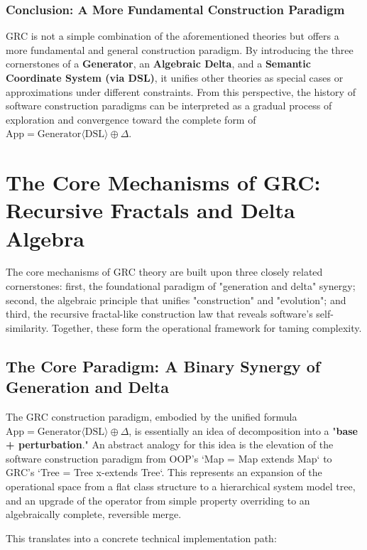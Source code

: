 \documentclass[11pt]{article}
\begin{document}
\subsubsection{Conclusion: A More Fundamental Construction Paradigm}

GRC is not a simple combination of the aforementioned theories but offers a more fundamental and general construction paradigm. By introducing the three cornerstones of a \textbf{Generator}, an \textbf{Algebraic Delta}, and a \textbf{Semantic Coordinate System (via DSL)}, it unifies other theories as special cases or approximations under different constraints. From this perspective, the history of software construction paradigms can be interpreted as a gradual process of exploration and convergence toward the complete form of $\text{App} = \text{Generator}\langle\text{DSL}\rangle \oplus \Delta$.

\section{The Core Mechanisms of GRC: Recursive Fractals and Delta Algebra}

The core mechanisms of GRC theory are built upon three closely related cornerstones: first, the foundational paradigm of "generation and delta" synergy; second, the algebraic principle that unifies "construction" and "evolution"; and third, the recursive fractal-like construction law that reveals software's self-similarity. Together, these form the operational framework for taming complexity.

\subsection{The Core Paradigm: A Binary Synergy of Generation and Delta}

The GRC construction paradigm, embodied by the unified formula $\text{App} = \text{Generator}\langle\text{DSL}\rangle \oplus \Delta$, is essentially an idea of decomposition into a "\textbf{base + perturbation}." An abstract analogy for this idea is the elevation of the software construction paradigm from OOP's `Map = Map extends Map` to GRC's `Tree = Tree x-extends Tree`. This represents an expansion of the operational space from a flat class structure to a hierarchical system model tree, and an upgrade of the operator from simple property overriding to an algebraically complete, reversible merge.

This translates into a concrete technical implementation path:
\end{document}
